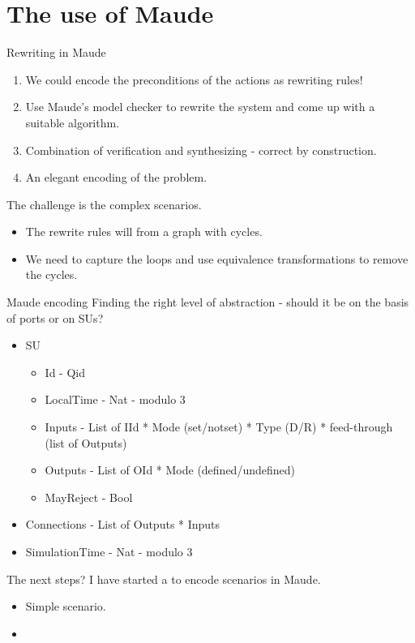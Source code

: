 \documentclass{beamer}
\begin{document}
\section{The use of Maude}

\begin{frame}{Rewriting in Maude}
    \begin{enumerate}
        \item We could encode the preconditions of the actions as rewriting rules!
        \item Use Maude's model checker to rewrite the system and come up with a suitable algorithm.
        \item Combination of verification and synthesizing - correct by construction. 
        \item An elegant encoding of the problem.
    \end{enumerate}

    The challenge is the complex scenarios.
    \begin{itemize}
        \item The rewrite rules will from a graph with cycles.
        \item We need to capture the loops and use equivalence transformations to remove the cycles.
    \end{itemize}
\end{frame}

\begin{frame}{Maude encoding}
    Finding the right level of abstraction - should it be on the basis of ports or on SUs?
\begin{itemize}
    \item SU
    \begin{itemize}
        \item Id - Qid
        \item LocalTime - Nat - modulo 3
        \item Inputs - List of IId * Mode (set/notset) * Type (D/R) * feed-through (list of Outputs)
        \item Outputs - List of OId * Mode (defined/undefined)
        \item MayReject - Bool
    \end{itemize}
    \item Connections - List of Outputs * Inputs
    \item SimulationTime - Nat - modulo 3
\end{itemize}
\end{frame}

\begin{frame}{The next steps?}
    I have started a to encode scenarios in Maude.
    \begin{itemize}
        \item Simple scenario.
        \item 
    \end{itemize}   
\end{frame}
\end{document}
